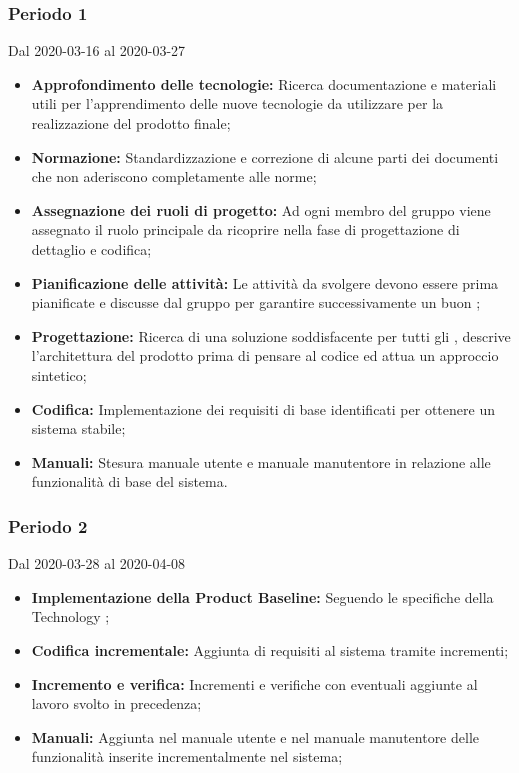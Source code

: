 \subsubsection{Periodo 1} 
Dal 2020-03-16 al 2020-03-27\\
\begin{itemize}
	\item \textbf{Approfondimento delle tecnologie:} Ricerca documentazione e materiali utili per l'apprendimento delle nuove tecnologie da utilizzare per la realizzazione del prodotto finale;
	\item \textbf{Normazione:} Standardizzazione e correzione di alcune parti dei documenti che non aderiscono completamente alle norme;
	\item \textbf{Assegnazione dei ruoli di progetto:} Ad ogni membro del gruppo viene assegnato il ruolo principale da ricoprire nella fase di progettazione di dettaglio e codifica;
	\item \textbf{Pianificazione delle attività:} Le attività da svolgere devono essere prima pianificate e discusse dal gruppo per garantire successivamente un buon ;
	\item \textbf{Progettazione:} Ricerca di una soluzione soddisfacente per tutti gli , descrive l'architettura del prodotto prima di pensare al codice ed attua un approccio sintetico;
	\item \textbf{Codifica:} Implementazione dei requisiti di base identificati per ottenere un sistema stabile;
	\item \textbf{Manuali:} Stesura manuale utente e manuale manutentore in relazione alle funzionalità di base del sistema.
\end{itemize}
\subsubsection{Periodo 2} 
Dal 2020-03-28 al 2020-04-08\\
\begin{itemize}
	\item \textbf{Implementazione della Product Baseline:} Seguendo le specifiche della Technology ;
	\item \textbf{Codifica incrementale:} Aggiunta di requisiti al sistema tramite incrementi;
	\item \textbf{Incremento e verifica:} Incrementi e verifiche con eventuali aggiunte al lavoro svolto in precedenza;
	\item \textbf{Manuali:} Aggiunta nel manuale utente e nel manuale manutentore delle funzionalità inserite incrementalmente nel sistema;
\end{itemize}
